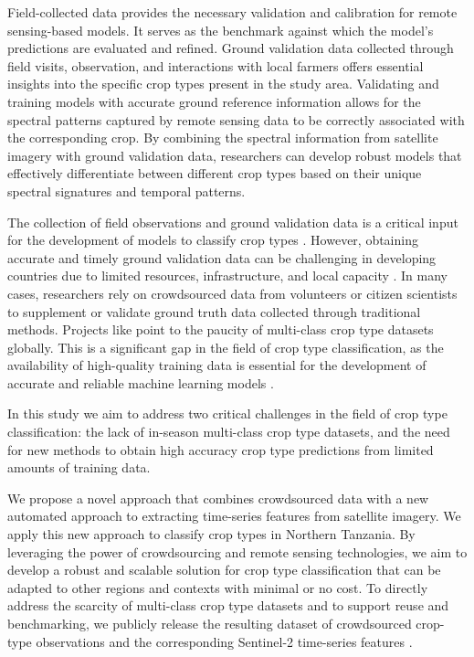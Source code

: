 \documentclass[
  journal,
  twocolumn]{IEEEtran}
\begin{document}
Field-collected data provides the necessary validation and calibration
for remote sensing-based models. It serves as the benchmark against
which the model's predictions are evaluated and refined. Ground
validation data collected through field visits, observation, and
interactions with local farmers offers essential insights into the
specific crop types present in the study area. Validating and training
models with accurate ground reference information allows for the
spectral patterns captured by remote sensing data to be correctly
associated with the corresponding crop. By combining the spectral
information from satellite imagery with ground validation data,
researchers can develop robust models that effectively differentiate
between different crop types based on their unique spectral signatures
and temporal patterns.

The collection of field observations and ground validation data is a
critical input for the development of models to classify crop types
\citep{delince2017handbook, MA2019166}. However, obtaining accurate and
timely ground validation data can be challenging in developing countries
due to limited resources, infrastructure, and local capacity
\citep{delince2017handbook, begue2018remote}. In many cases, researchers
rely on crowdsourced data from volunteers or citizen scientists to
supplement or validate ground truth data collected through traditional
methods. Projects like \citep{tseng2021cropharvest} point to the paucity
of multi-class crop type datasets globally. This is a significant gap in
the field of crop type classification, as the availability of
high-quality training data is essential for the development of accurate
and reliable machine learning models \citep{rs13132591}.

In this study we aim to address two critical challenges in the field of
crop type classification: the lack of in-season multi-class crop type
datasets, and the need for new methods to obtain high accuracy crop type
predictions from limited amounts of training data.

We propose a novel approach that combines crowdsourced data with a new
automated approach to extracting time-series features from satellite
imagery. We apply this new approach to classify crop types in Northern
Tanzania. By leveraging the power of crowdsourcing and remote sensing
technologies, we aim to develop a robust and scalable solution for crop
type classification that can be adapted to other regions and contexts
with minimal or no cost. To directly address the scarcity of multi-class
crop type datasets and to support reuse and benchmarking, we publicly
release the resulting dataset of crowdsourced crop-type observations and
the corresponding Sentinel-2 time-series features
\citep{mann2025tanzania}.
\end{document}
